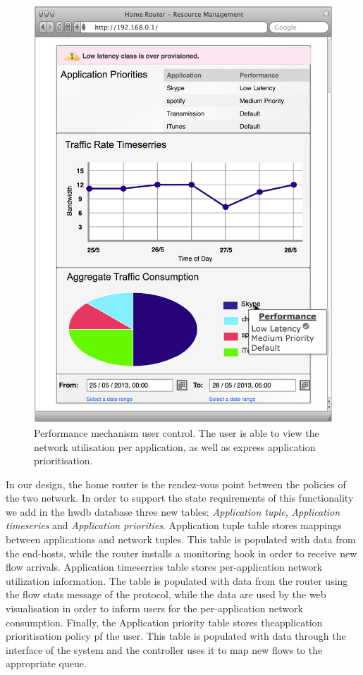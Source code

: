 \begin{figure}
  \centering
  \includegraphics[width=0.8\columnwidth]{homework_intf_qos}
  \caption{\label{fig:homework_intf_qos} Performance mechanism  user control.
    The user is able to view the network utilisation per application, as well as
    express application prioritisation.}
\end{figure}

In our design, the home router is the rendez-vous point between the
policies of the two network. In order to support the state requirements of this
functionality we add in the hwdb database three new tables: {\it Application
  tuple}, {\it Application timeseries} and {\it Application priorities}.
Application tuple table stores mappings between applications and 
network tuples. This table is populated with data from the end-hosts, while the
router installs a monitoring hook in order to receive new flow arrivals.
Application timeserries table stores per-application network utilization
information. The table is populated with data from the router using the
flow stats message of the \of protocol, while the data are used by the web
visualisation in order to inform users for the per-application network consumption. 
Finally, the Application priority table stores theapplication prioritisation
policy pf the user. This table is populated with data through the interface
of the system and the controller uses it to map new flows to the appropriate
queue.

